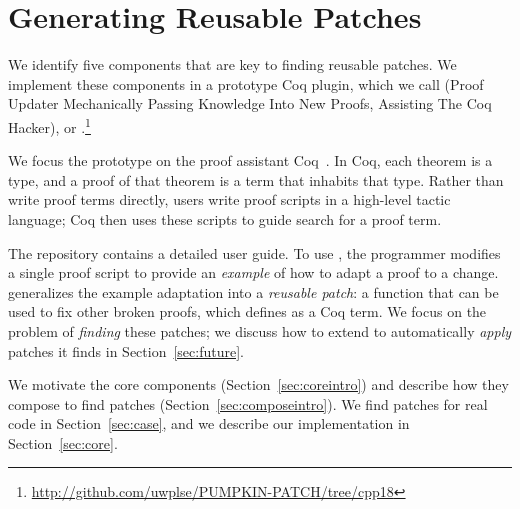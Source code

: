 \section{Generating Reusable Patches}
\label{sec:sys}

We identify five components that are key to finding reusable patches.
We implement these components in a prototype Coq plugin, which we call
\sysnamelong (Proof Updater Mechanically Passing Knowledge Into New Proofs, Assisting The Coq Hacker), or \sysname.\footnote{\url{http://github.com/uwplse/PUMPKIN-PATCH/tree/cpp18}}

We focus the \sysname prototype on the proof assistant Coq~\cite{coq}.
In Coq, each theorem is a type, and a proof of that theorem is a term that inhabits that type. 
Rather than write proof terms directly, users write proof scripts in a high-level tactic language;
Coq then uses these scripts to guide search for a proof term.

The \sysname repository contains 
a detailed user guide.
To use \sysname, the programmer modifies a single proof script to provide an \textit{example} of how to adapt a proof to a
change. \sysname generalizes the example adaptation into a \textit{reusable patch}: a function
that can be used to fix other broken proofs, which \sysname defines as a Coq term.
We focus on the problem of \textit{finding} these patches;
we discuss how to extend \sysname to automatically \textit{apply} patches it finds in Section~\ref{sec:future}.

We motivate the core components (Section~\ref{sec:coreintro}) and describe how they
compose to find patches (Section~\ref{sec:composeintro}). We find patches for 
real code in Section~\ref{sec:case}, and we describe our implementation
in Section~\ref{sec:core}.

